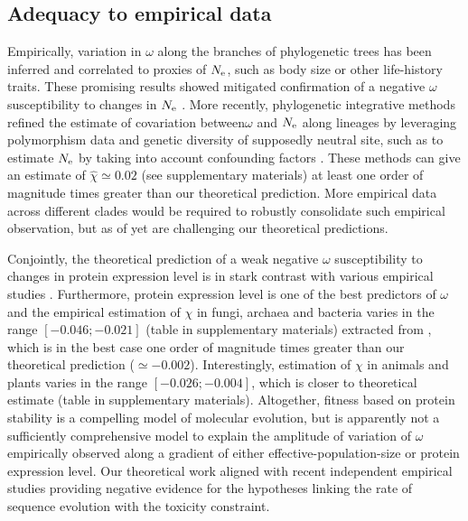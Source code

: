 \subsection{Adequacy to empirical data}
Empirically, variation in $\omega$ along the branches of phylogenetic trees has been inferred and correlated to proxies of $N_{\mathrm{e}}$, such as body size or other life-history traits.
These promising results showed mitigated confirmation of a negative $\omega$ susceptibility to changes in $N_{\mathrm{e}}$ \citep{Lanfear2014}.
More recently, phylogenetic integrative methods refined the estimate of covariation between$\omega$ and $N_{\mathrm{e}}$ along lineages by leveraging polymorphism data and genetic diversity of supposedly \gls{neutral} site, such as to estimate $N_{\mathrm{e}}$ by taking into account confounding factors \citep{Brevet2019}.
These methods can give an estimate of $\hat{\chi} \simeq 0.02$ (see supplementary materials) at least one order of magnitude times greater than our theoretical prediction.
More empirical data across different clades would be required to robustly consolidate such empirical observation, but as of yet are challenging our theoretical predictions.

Conjointly, the theoretical prediction of a weak negative $\omega$ susceptibility to changes in protein expression level is in stark contrast with various empirical studies \citep{Duret2000, Rocha2004, Wang2011, Song2017}.
Furthermore, protein expression level is one of the best predictors of $\omega$ and the empirical estimation of $\chi$ in fungi, archaea and bacteria varies in the range $[-0.046;-0.021]$ (table in supplementary materials) extracted from  \citet{Zhang2015}, which is in the best case one order of magnitude times greater than our theoretical prediction ($\simeq -0.002$).
Interestingly, estimation of $\chi$ in animals and plants varies in the range $[-0.026;-0.004]$, which is closer to theoretical estimate (table in supplementary materials). Altogether, fitness based on protein stability is a compelling model of molecular evolution, but is apparently not a sufficiently comprehensive model to explain the amplitude of variation of $\omega$ empirically observed along a gradient of either \gls{effective-population-size} or protein expression level.
Our theoretical work aligned with recent independent empirical studies providing negative evidence for the hypotheses linking the rate of sequence evolution with the toxicity constraint\citep{Plata2017,Razban2019,Biesiadecka2020}.


